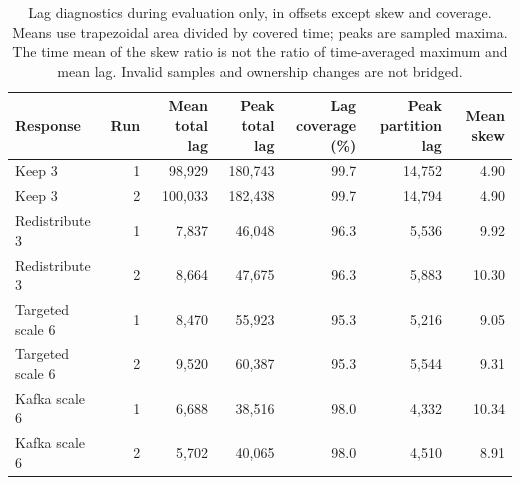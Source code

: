\begin{table}[!htbp]
\centering\small
\setlength{\tabcolsep}{3pt}
\renewcommand{\arraystretch}{1.12}
\begin{tabular}{@{}lrrrrrr@{}}
\toprule
Response & Run & \shortstack{Mean total\\lag} & \shortstack{Peak total\\lag} & \shortstack{Lag coverage\\(\%)} & \shortstack{Peak partition\\lag} & Mean skew\\
\midrule
Keep 3 & 1 & 98,929 & 180,743 & 99.7 & 14,752 & 4.90\\
Keep 3 & 2 & 100,033 & 182,438 & 99.7 & 14,794 & 4.90\\
Redistribute 3 & 1 & 7,837 & 46,048 & 96.3 & 5,536 & 9.92\\
Redistribute 3 & 2 & 8,664 & 47,675 & 96.3 & 5,883 & 10.30\\
Targeted scale 6 & 1 & 8,470 & 55,923 & 95.3 & 5,216 & 9.05\\
Targeted scale 6 & 2 & 9,520 & 60,387 & 95.3 & 5,544 & 9.31\\
Kafka scale 6 & 1 & 6,688 & 38,516 & 98.0 & 4,332 & 10.34\\
Kafka scale 6 & 2 & 5,702 & 40,065 & 98.0 & 4,510 & 8.91\\
\bottomrule
\end{tabular}
\caption{Lag diagnostics during evaluation only, in offsets except skew and coverage. Means use trapezoidal area divided by covered time; peaks are sampled maxima. The time mean of the skew ratio is not the ratio of time-averaged maximum and mean lag. Invalid samples and ownership changes are not bridged.}
\label{tab:twelve-partition-diagnostics}
\end{table}
